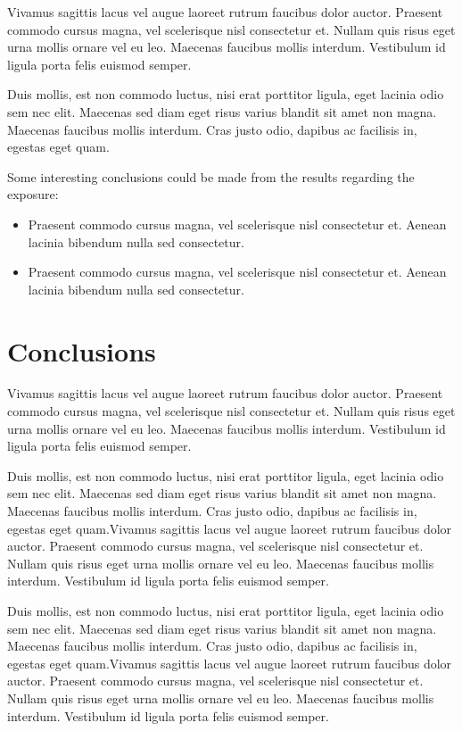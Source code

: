 \documentclass[journal]{../template/IEEEtran}
\begin{document}
Vivamus sagittis lacus vel augue laoreet rutrum faucibus dolor auctor. Praesent commodo cursus magna, vel scelerisque nisl consectetur et. Nullam quis risus eget urna mollis ornare vel eu leo. Maecenas faucibus mollis interdum. Vestibulum id ligula porta felis euismod semper.

Duis mollis, est non commodo luctus, nisi erat porttitor ligula, eget lacinia odio sem nec elit. Maecenas sed diam eget risus varius blandit sit amet non magna. Maecenas faucibus mollis interdum. Cras justo odio, dapibus ac facilisis in, egestas eget quam.

Some interesting conclusions could be made from the results regarding the exposure:
\begin{itemize}
	\item Praesent commodo cursus magna, vel scelerisque nisl consectetur et. Aenean lacinia bibendum nulla sed consectetur.
	\item Praesent commodo cursus magna, vel scelerisque nisl consectetur et. Aenean lacinia bibendum nulla sed consectetur.
\end{itemize}

\section{Conclusions}

Vivamus sagittis lacus vel augue laoreet rutrum faucibus dolor auctor. Praesent commodo cursus magna, vel scelerisque nisl consectetur et. Nullam quis risus eget urna mollis ornare vel eu leo. Maecenas faucibus mollis interdum. Vestibulum id ligula porta felis euismod semper.

Duis mollis, est non commodo luctus, nisi erat porttitor ligula, eget lacinia odio sem nec elit. Maecenas sed diam eget risus varius blandit sit amet non magna. Maecenas faucibus mollis interdum. Cras justo odio, dapibus ac facilisis in, egestas eget quam.Vivamus sagittis lacus vel augue laoreet rutrum faucibus dolor auctor. Praesent commodo cursus magna, vel scelerisque nisl consectetur et. Nullam quis risus eget urna mollis ornare vel eu leo. Maecenas faucibus mollis interdum. Vestibulum id ligula porta felis euismod semper.

Duis mollis, est non commodo luctus, nisi erat porttitor ligula, eget lacinia odio sem nec elit. Maecenas sed diam eget risus varius blandit sit amet non magna. Maecenas faucibus mollis interdum. Cras justo odio, dapibus ac facilisis in, egestas eget quam.Vivamus sagittis lacus vel augue laoreet rutrum faucibus dolor auctor. Praesent commodo cursus magna, vel scelerisque nisl consectetur et. Nullam quis risus eget urna mollis ornare vel eu leo. Maecenas faucibus mollis interdum. Vestibulum id ligula porta felis euismod semper.
\end{document}
